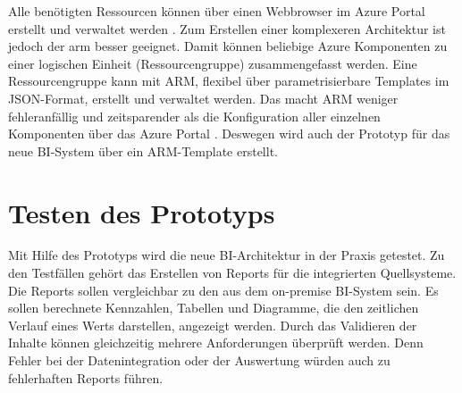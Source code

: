 Alle benötigten Ressourcen können über einen Webbrowser im Azure Portal erstellt und verwaltet werden \cite{chilberto_building_2020}. Zum Erstellen einer komplexeren Architektur ist jedoch der \ac{arm} besser geeignet. Damit können beliebige Azure Komponenten zu einer logischen Einheit (Ressourcengruppe) zusammengefasst werden. Eine Ressourcengruppe kann mit ARM, flexibel über parametrisierbare Templates im JSON-Format, erstellt und verwaltet werden. Das macht ARM weniger fehleranfällig und zeitsparender als die Konfiguration aller einzelnen Komponenten über das Azure Portal \cite{monadjemi_azure-administration_2017}. Deswegen wird auch der Prototyp für das neue BI-System über ein ARM-Template erstellt.

\section{Testen des Prototyps}
\label{sec:intro:testenDesPrototyps}
Mit Hilfe des Prototyps wird die neue BI-Architektur in der Praxis getestet. Zu den Testfällen gehört das Erstellen von Reports für die integrierten Quellsysteme. Die Reports sollen vergleichbar zu den aus dem on-premise BI-System sein. Es sollen berechnete Kennzahlen, Tabellen und Diagramme, die den zeitlichen Verlauf eines Werts darstellen, angezeigt werden. Durch das Validieren der Inhalte können gleichzeitig mehrere Anforderungen überprüft werden. Denn Fehler bei der Datenintegration oder der Auswertung würden auch zu fehlerhaften Reports führen.